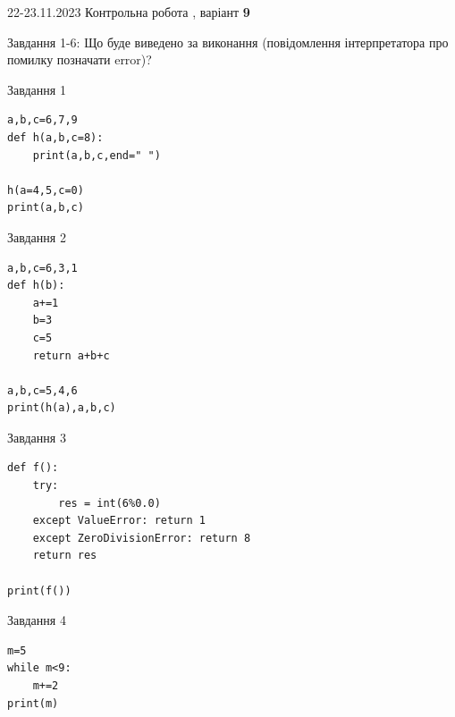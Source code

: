 \documentclass[12pt, ukrainian]{article}
\begin{document}
{{22-23.11.2023 Контрольна робота , варіант  \No \textbf { 9 }\par}}
{

Завдання 1-6: Що буде виведено за виконання (повідомлення інтерпретатора про помилку позначати error)?


\begin{minipage}[t]{9.7cm}                
{\begin{center}Завдання {1}\end{center}}
\begin{verbatim}
a,b,c=6,7,9
def h(a,b,c=8):
    print(a,b,c,end=" ")

h(a=4,5,c=0)
print(a,b,c)
\end{verbatim}     
\end{minipage}
\vline \hspace{8mm}
\begin{minipage}[t]{8.0cm}                
{\begin{center}Завдання {2}\end{center}}
\begin{verbatim}
a,b,c=6,3,1
def h(b):
    a+=1
    b=3
    c=5
    return a+b+c

a,b,c=5,4,6
print(h(a),a,b,c)
\end{verbatim}     
\end{minipage}

\vspace{15mm}
\begin{minipage}[t]{9.7cm}                
{\begin{center}Завдання {3}\end{center}}
\begin{verbatim}
def f():
    try:
        res = int(6%0.0)
    except ValueError: return 1
    except ZeroDivisionError: return 8
    return res

print(f())
\end{verbatim}     
\end{minipage}
\vline \hspace{8mm}
\begin{minipage}[t]{8.0cm}                
{\begin{center}Завдання {4}\end{center}}
\begin{verbatim}
m=5
while m<9:
    m+=2
print(m)
\end{verbatim}     
\end{minipage}

}
\end{document}
